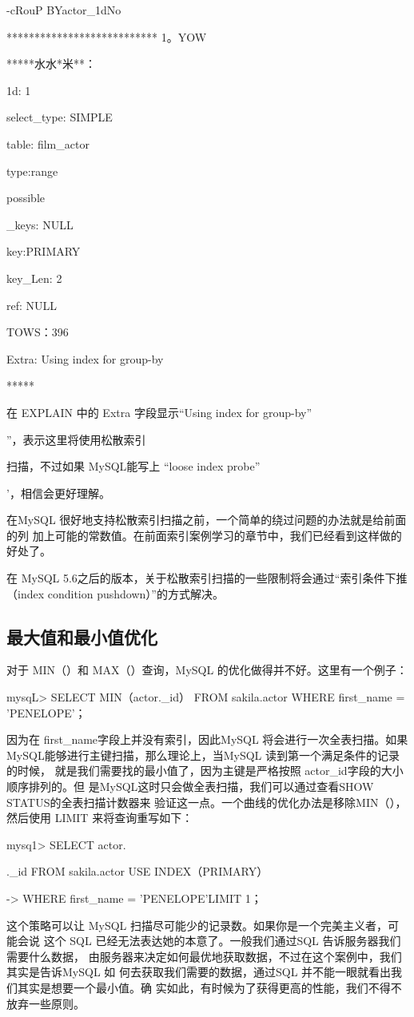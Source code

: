 -cRouP BYactor\_1dNo

*************************** 1。YOW

*****水水*米**：

1d: 1

select\_type: SIMPLE

table: film\_actor

type:range

possible

\_keys: NULL

key:PRIMARY

key\_Len: 2

ref: NULL

TOWS：396

Extra: Using index for group-by

*****

在 EXPLAIN 中的 Extra 字段显示“Using index for group-by”

”，表示这里将使用松散索引

扫描，不过如果 MySQL能写上 “loose index probe”

'，相信会更好理解。

在MySQL 很好地支持松散索引扫描之前，一个简单的绕过问题的办法就是给前面的列
加上可能的常数值。在前面索引案例学习的章节中，我们已经看到这样做的好处了。

在 MySQL 5.6之后的版本，关于松散索引扫描的一些限制将会通过“索引条件下推（index
condition pushdown）”的方式解决。

\subsection{最大值和最小值优化}
对于 MIN（）和 MAX（）查询，MySQL 的优化做得并不好。这里有一个例子：

mysqL> SELECT MIN（actor.\_id） FROM sakila.actor WHERE first\_name = 'PENELOPE'；

因为在 first\_name字段上并没有索引，因此MySQL 将会进行一次全表扫描。如果
MySQL能够进行主键扫描，那么理论上，当MySQL 读到第一个满足条件的记录的时候，
就是我们需要找的最小值了，因为主键是严格按照 actor\_id字段的大小顺序排列的。但
是MySQL这时只会做全表扫描，我们可以通过查看SHOW STATUS的全表扫描计数器来
验证这一点。一个曲线的优化办法是移除MIN（），然后使用 LIMIT 来将查询重写如下：

mysq1> SELECT actor.

.\_id FROM sakila.actor USE INDEX（PRIMARY）

-> WHERE first\_name = 'PENELOPE'LIMIT 1；

这个策略可以让 MySQL 扫描尽可能少的记录数。如果你是一个完美主义者，可能会说
这个 SQL 已经无法表达她的本意了。一般我们通过SQL 告诉服务器我们需要什么数据，
由服务器来决定如何最优地获取数据，不过在这个案例中，我们其实是告诉MySQL 如
何去获取我们需要的数据，通过SQL 并不能一眼就看出我们其实是想要一个最小值。确
实如此，有时候为了获得更高的性能，我们不得不放弃一些原则。

